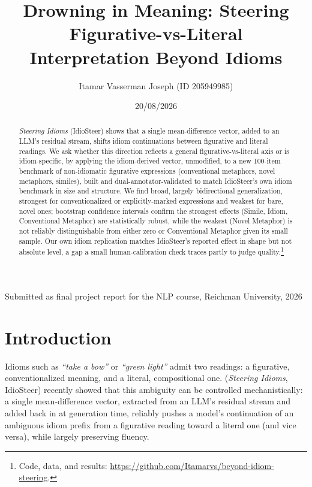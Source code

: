 \documentclass[11pt]{article}
\title{Drowning in Meaning: Steering Figurative-vs-Literal\\ Interpretation Beyond Idioms}
\author{Itamar Vasserman Joseph (ID 205949985)}
\date{20/08/2026}
\begin{document}
\maketitle
\vspace{-2em}
\begin{center}
Submitted as final project report for the NLP course, Reichman University, 2026
\end{center}
\vspace{1em}

\begin{abstract}
\emph{Steering Idioms} (IdioSteer) shows that a single mean-difference vector, added to
an LLM's residual stream, shifts idiom continuations between figurative and literal
readings. We ask whether this direction reflects a general figurative-vs-literal axis or
is idiom-specific, by applying the idiom-derived vector, unmodified, to a new 100-item
benchmark of non-idiomatic figurative expressions (conventional metaphors, novel
metaphors, similes), built and dual-annotator-validated to match IdioSteer's own idiom
benchmark in size and structure. We find broad, largely bidirectional generalization,
strongest for conventionalized or explicitly-marked expressions and weakest for bare,
novel ones; bootstrap confidence intervals confirm the strongest effects (Simile, Idiom,
Conventional Metaphor) are statistically robust, while the weakest (Novel Metaphor) is
not reliably distinguishable from either zero or Conventional Metaphor given its small
sample. Our own idiom replication matches IdioSteer's reported effect in shape but not
absolute level, a gap a small human-calibration check traces partly to judge
quality.\footnote{Code, data, and results:
\url{https://github.com/Itamarvs/beyond-idiom-steering}.}
\end{abstract}

\section{Introduction}

Idioms such as \emph{``take a bow''} or \emph{``green light''} admit two readings: a
figurative, conventionalized meaning, and a literal, compositional one. \citet{idiosteer}
(\emph{Steering Idioms}, IdioSteer) recently showed that this ambiguity can be controlled
mechanistically: a single mean-difference vector, extracted from an LLM's residual stream
and added back in at generation time, reliably pushes a model's continuation of an
ambiguous idiom prefix from a figurative reading toward a literal one (and vice versa),
while largely preserving fluency.
\end{document}
